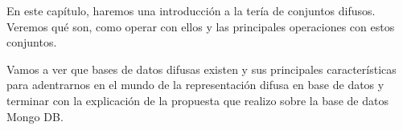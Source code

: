 En este capítulo, haremos una introducción a la tería de conjuntos difusos. Veremos qué son, como operar con ellos y las principales operaciones con estos conjuntos.

Vamos a ver que bases de datos difusas existen y sus principales características para adentrarnos en el mundo de la representación difusa en base de datos y terminar con la explicación de la propuesta que realizo sobre la base de datos Mongo DB.


